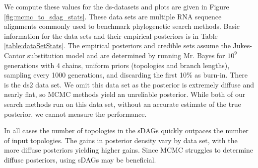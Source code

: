 \documentclass{article}
\begin{document}
We compute these values for the ds-datasets and plots are given in Figure \ref{fig:mcmc_to_sdag_stats}.
These data sets are multiple RNA sequence alignments commonly used to benchmark phylogenetic search methods.
Basic information for the data sets and their empirical posteriors is in Table \ref{table:dataSetStats}.
The empirical posteriors and credible sets assume the Jukes-Cantor substitution model and are determined by running Mr. Bayes for $10^{9}$ generations with 4 chains, uniform priors (topologies and branch lengths), sampling every 1000 generations, and discarding the first 10\% 
as burn-in. There is the ds2 data set. We omit this data set as the posterior is extremely diffuse and nearly flat, so MCMC methods yield an unreliable posterior.
While both of our search methods run on this data set, without an accurate estimate of the true posterior, we cannot measure the performance.

In all cases the number of topologies in the sDAGs quickly outpaces the number of input topologies. 
The gains in posterior density vary by data set, with the more diffuse posteriors yielding higher gains.
Since MCMC struggles to determine diffuse posteriors, using sDAGs may be beneficial.
\end{document}
